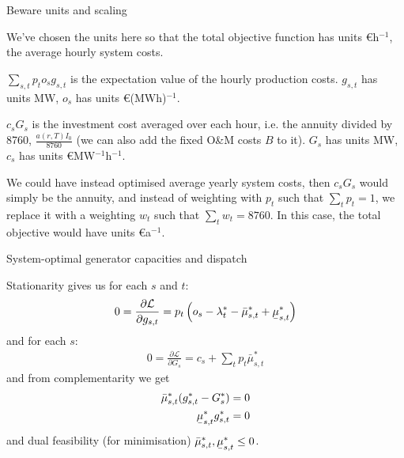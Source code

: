 \documentclass[10pt,aspectratio=169,dvipsnames]{beamer}
\def\l{\lambda}
\def\m{\mu}
\def\d{\partial}
\def\cL{\mathcal{L}}
\newcommand{\ubar}[1]{\text{\b{$#1$}}}
\begin{document}
\begin{frame}{Beware units and scaling}

  We've chosen the units here so that the total objective function has units \euro{}h$^{-1}$, the \alert{average hourly system costs}.

  $\sum_{s,t} p_t o_{s} g_{s,t}$ is the expectation value of the hourly production costs. $g_{s,t}$ has units MW, $o_{s}$ has units \euro{}(MWh)$^{-1}$.

  $c_sG_s$ is the investment cost averaged over each hour, i.e. the annuity divided by 8760, $\frac{a(r,T)I_0}{8760}$ (we can also add the fixed O\&{}M costs $B$ to it). $G_s$ has units MW, $c_s$ has units
  \euro{}MW$^{-1}$h$^{-1}$.

  We could have instead optimised \alert{average yearly system costs}, then $c_s G_s$ would simply be the annuity, and instead of weighting with $p_t$ such that $\sum_t p_t = 1$, we replace it with a weighting $w_t$ such that $\sum_t w_t = 8760$. In this case, the total objective would have units \euro{}a$^{-1}$.

\end{frame}

\begin{frame}{System-optimal generator capacities and dispatch}

  Stationarity gives us for each $s$ and $t$:
  \begin{align*}
        0 = \frac{\d \cL}{\d g_{s,t}}  = p_t \left(o_s - \l_t^* - \bar{\m}^*_{s,t} + \ubar{\m}^*_{s,t} \right)
  \end{align*}
  and for each $s$:
  \begin{align*}
        0 = \frac{\d \cL}{\d G_{s}}  = c_s + \sum_t p_t \bar{\m}^*_{s,t}
  \end{align*}
  and from complementarity we get
  \begin{align*}
    \bar{\m}^*_{s,t}(g_{s,t}^* - G_s^*) & = 0 \\
    \ubar{\m}^*_{s,t}g_{s,t}^* & = 0
  \end{align*}
  and dual feasibility (for minimisation) $ \bar{\m}^*_{s,t},  \ubar{\m}^*_{s,t} \leq 0$.
\end{frame}
\end{document}
